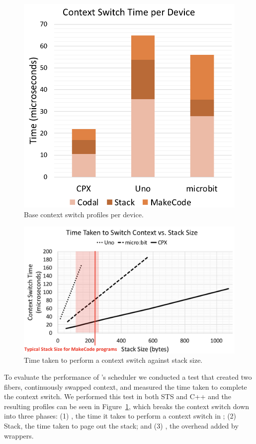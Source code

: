 \begin{figure}[ht]
    \includegraphics[width=.8\columnwidth]{images/context-switch.png}
\caption{\label{fig:context-switch}Base context switch profiles per device.}
\end{figure}

\begin{figure}[ht]
    \includegraphics[width=\columnwidth]{images/context-vs-stack.png}
\caption{\label{fig:context-vs-stack}Time taken to perform a context switch against stack size.}
\end{figure}

To evaluate the performance of \CON's scheduler we conducted a test that created two fibers, continuously swapped context, and measured the time taken to complete the context switch.
We performed this test in both STS and C++ and the resulting profiles can be seen in Figure~\ref{fig:context-switch}, which
breaks the context switch down into three phases:
(1) \CON, the time it takes to perform a context switch in \CON;
(2) Stack, the time taken to page out the \MC stack; and
(3) \MCN, the overhead added by \MC wrappers.

